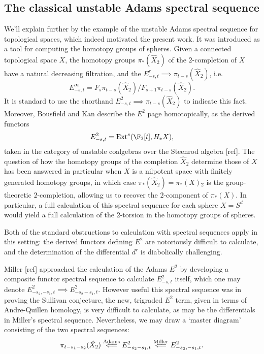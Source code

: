 \documentclass[11pt]{article}
\begin{document}
\subsection*{The classical unstable Adams spectral sequence}
We'll explain further by the example of the unstable Adams spectral sequence for topological spaces, which indeed motivated the present work. It was introduced as a tool for computing the homotopy groups of spheres. Given a connected topological space $X$, the homotopy groups $\pi_*(\hat X_2)$ of the $2$-completion of $X$ have a natural decreasing filtration, and the $E^r_{-s,t}\implies \pi_{t-s}(\hat X_2)$, i.e.\ 
\[E^\infty_{-s,t}=F_s\pi_{t-s}(\hat X_2)/F_{s+1}\pi_{t-s}(\hat X_2).\]
It is standard to use the shorthand $E^2_{-s,t}\implies \pi_{t-s}(\hat X_2)$ to indicate this fact. Moreover, Bousfield and Kan describe the $E^2$ page homotopically, as the derived functors
\[E^2_{-s,t}=\Ext^s(\F_2[t],H_*X),\]
taken in the category of unstable coalgebras over the Steenrod algebra [ref]. The question of how the homotopy groups of the completion $\hat X_2$ determine those of $X$ has been answered in particular when $X$ is a nilpotent space with finitely generated homotopy groups, in which case $\pi_*(\hat X_2)=\pi_*(X)\hat{_2}$ is the group-theoretic $2$-completion, allowing us to recover the $2$-component of $\pi_*(X)$. In particular, a full calculation of this spectral sequence for each sphere $X=S^d$ would yield a full calculation of the 2-torsion in the homotopy groups of spheres.

Both of the standard obstructions to calculation with spectral sequences apply in this setting: the derived functors defining $E^2$ are notoriously difficult to calculate, and the determination of the differential $d^r$ is diabolically challenging. 





Miller [ref] approached the calculation of the Adams $E^2$ by developing a composite functor spectral sequence to calculate $E^2_{-s,t}$ itself, which one may denote $E^2_{-s_2,-s_1,t}\implies E^2_{-s_2-s_1,t}$. However useful this spectral sequence was in proving the Sullivan conjecture, the new, trigraded $E^2$ term, given in terms of Andre-Quillen homology, is very difficult to calculate, as may be the differentials in Miller's spectral sequence. Nevertheless, we may draw a `master diagram' consisting of the two spectral sequences:
\[\pi_{t-s_1-s_2}(\hat X_2)\overset{\textup{Adams}}{\impliedby}E^2_{-s_2-s_1,t}\overset{\textup{Miller}}{\impliedby} E^2_{-s_2,-s_1,t}.\]
\end{document}
